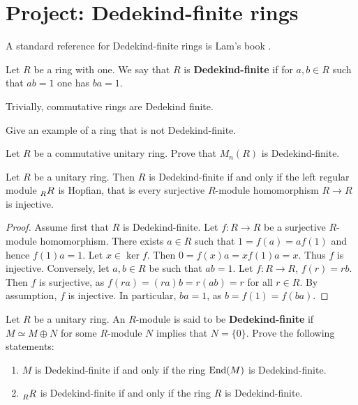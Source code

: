 
\section{Project: Dedekind-finite rings}
\label{section:DedekindFinite}

A standard reference for Dedekind-finite rings 
is Lam's book \cite{MR2278849}. 

\begin{definition}
    Let $R$ be a ring with one. We say that $R$ is \textbf{Dedekind-finite} if 
    for $a,b\in R$ such that $ab=1$ one has $ba=1$. 
\end{definition}

Trivially, commutative rings are Dedekind finite. 

\begin{exercise}
    Give an example of a ring that is not Dedekind-finite. 
\end{exercise}

\begin{exercise}
    Let $R$ be a commutative unitary ring. Prove that $M_n(R)$ is Dedekind-finite. 
\end{exercise}

\begin{proposition}
    Let $R$ be a unitary ring. Then $R$ is Dedekind-finite if and only if the left regular module 
    $\prescript{}{R}{R}$ is Hopfian, that is 
    every surjective $R$-module homomorphism $R\to R$ is injective.
\end{proposition}

\begin{proof}
    Assume first that $R$ is Dedekind-finite. Let $f\colon R\to R$ be a surjective $R$-module homomorphism. There exists $a \in R$ such that $1=f(a)=af(1)$ and hence $f(1)a=1$. Let $x\in\ker f$. Then $0=f(x)a=xf(1)a=x$. Thus $f$ is injective. Conversely, let $a,b\in R$ be such that $ab=1$. Let $f\colon R\to R$, $f(r)=rb$. Then $f$ is surjective, as $f(ra)=(ra)b=r(ab)=r$ for all $r \in R$. By assumption, $f$ is injective. In particular, $ba=1$, as $b=f(1)=f(ba)$. 
\end{proof}

\begin{exercise}
    Let $R$ be a unitary ring. An $R$-module is said to be \textbf{Dedekind-finite}
    if $M\simeq M\oplus N$ for some $R$-module $N$ implies that $N=\{0\}$. 
    Prove the following statements:
    \begin{enumerate}
        \item $M$ is Dedekind-finite if and only if the ring 
            $\operatorname{End}(M)$ is Dedekind-finite. 
        \item $\prescript{}{R}{R}$ is Dedekind-finite if and only if the ring $R$ is Dedekind-finite. 
    \end{enumerate}
\end{exercise}

